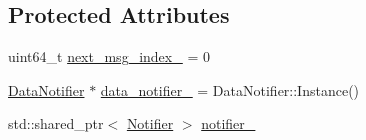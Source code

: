 \subsection*{Protected Attributes}
\begin{DoxyCompactItemize}
\item 
uint64\-\_\-t \hyperlink{classapollo_1_1cyber_1_1data_1_1DataVisitorBase_a976dda8aacd357161f4b6e49b699063e}{next\-\_\-msg\-\_\-index\-\_\-} = 0
\item 
\hyperlink{classapollo_1_1cyber_1_1data_1_1DataNotifier}{Data\-Notifier} $\ast$ \hyperlink{classapollo_1_1cyber_1_1data_1_1DataVisitorBase_ac8ac7c3bb6c789652df9155e65504ae8}{data\-\_\-notifier\-\_\-} = Data\-Notifier\-::\-Instance()
\item 
std\-::shared\-\_\-ptr$<$ \hyperlink{structapollo_1_1cyber_1_1data_1_1Notifier}{Notifier} $>$ \hyperlink{classapollo_1_1cyber_1_1data_1_1DataVisitorBase_a812c283846d1071937478c6ad23daa17}{notifier\-\_\-}
\end{DoxyCompactItemize}


